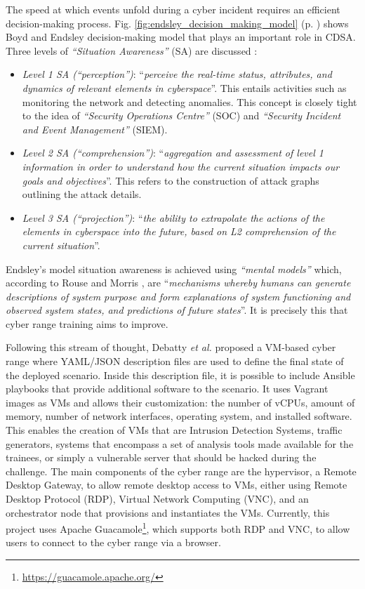 The speed at which events unfold during a cyber incident requires an efficient decision-making process. Fig. \ref{fig:endsley_decision_making_model} (p. \pageref{fig:endsley_decision_making_model}) shows Boyd and Endsley \cite{endsley_ref} decision-making model that plays an important role in CDSA. Three levels of \textit{``Situation Awareness''} (SA) are discussed \cite{building_cr_ref}:

\begin{itemize}
    \item \textit{Level 1 SA (\textit{``perception''})}: ``\textit{perceive the real-time status, attributes, and dynamics of relevant elements in cyberspace}''. This entails activities such as monitoring the network and detecting anomalies. This concept is closely tight to the idea of \textit{``Security Operations Centre''} (SOC) and \textit{``Security Incident and Event Management''} (SIEM).
    \item \textit{Level 2 SA (\textit{``comprehension''})}: ``\textit{aggregation and assessment of level 1 information in order to understand how the current situation impacts our goals and objectives}''. This refers to the construction of attack graphs outlining the attack details.
    \item \textit{Level 3 SA (\textit{``projection''})}: ``\textit{the ability to extrapolate the actions of the elements in cyberspace into the future, based on L2 comprehension of the current situation}''.
\end{itemize}

Endsley's model situation awareness is achieved using \textit{``mental models''} which, according to Rouse and Morris \cite{rouse_morris_ref}, are ``\textit{mechanisms whereby humans can generate descriptions of system purpose and form explanations of system functioning and observed system states, and predictions of future states}''. It is precisely this that cyber range training aims to improve.

Following this stream of thought, Debatty \textit{et al.} \cite{building_cr_ref} proposed a VM-based cyber range where YAML/JSON description files are used to define the final state of the deployed scenario. Inside this description file, it is possible to include Ansible playbooks that provide additional software to the scenario. It uses Vagrant images as VMs and allows their customization: the number of vCPUs, amount of memory, number of network interfaces, operating system, and installed software. This enables the creation of VMs that are Intrusion Detection Systems, traffic generators, systems that encompass a set of analysis tools made available for the trainees, or simply a vulnerable server that should be hacked during the challenge. The main components of the cyber range are the hypervisor, a Remote Desktop Gateway, to allow remote desktop access to VMs, either using Remote Desktop Protocol (RDP), Virtual Network Computing (VNC), and an orchestrator node that provisions and instantiates the VMs. Currently, this project uses Apache Guacamole\footnote{\url{https://guacamole.apache.org/}}, which supports both RDP and VNC, to allow users to connect to the cyber range via a browser.

